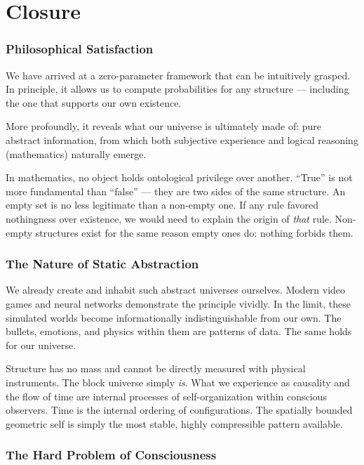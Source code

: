 \chapter{Closure}
\label{chap:closure}

\subsection*{Philosophical Satisfaction}

We have arrived at a zero-parameter framework that can be intuitively grasped. In principle, it allows us to compute probabilities for any structure — including the one that supports our own existence.

More profoundly, it reveals what our universe is ultimately made of: pure abstract information, from which both subjective experience and logical reasoning (mathematics) naturally emerge.

In mathematics, no object holds ontological privilege over another. ``True'' is not more fundamental than ``false'' — they are two sides of the same structure. An empty set is no less legitimate than a non-empty one. If any rule favored nothingness over existence, we would need to explain the origin of \emph{that} rule. Non-empty structures exist for the same reason empty ones do: nothing forbids them.

\subsection*{The Nature of Static Abstraction}

We already create and inhabit such abstract universes ourselves. Modern video games and neural networks demonstrate the principle vividly. In the limit, these simulated worlds become informationally indistinguishable from our own. The bullets, emotions, and physics within them are patterns of data. The same holds for our universe.

Structure has no mass and cannot be directly measured with physical instruments. The block universe simply \emph{is}. What we experience as causality and the flow of time are internal processes of self-organization within conscious observers. Time is the internal ordering of configurations. The spatially bounded geometric self is simply the most stable, highly compressible pattern available.

\subsection*{The Hard Problem of Consciousness}

